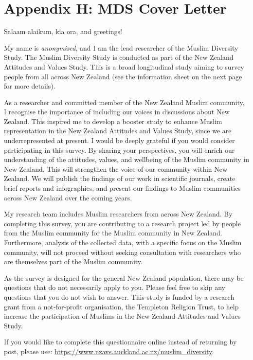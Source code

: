 \documentclass[
]{interact}
\begin{document}
\newpage{}

\section{Appendix H: MDS Cover
Letter}\label{appendix-h-mds-cover-letter}

\noindent Salaam alaikum, kia ora, and greetings!

\noindent My name is \emph{anonymised}, and I am the lead researcher of
the Muslim Diversity Study. The Muslim Diversity Study is conducted as
part of the New Zealand Attitudes and Values Study. This is a broad
longitudinal study aiming to survey people from all across New Zealand
(see the information sheet on the next page for more details).

\noindent As a researcher and committed member of the New Zealand Muslim
community, I recognise the importance of including our voices in
discussions about New Zealand. This inspired me to develop a booster
study to enhance Muslim representation in the New Zealand Attitudes and
Values Study, since we are underrepresented at present. I would be
deeply grateful if you would consider participating in this survey. By
sharing your perspectives, you will enrich our understanding of the
attitudes, values, and wellbeing of the Muslim community in New Zealand.
This will strengthen the voice of our community within New Zealand. We
will publish the findings of our work in scientific journals, create
brief reports and infographics, and present our findings to Muslim
communities across New Zealand over the coming years.

\noindent My research team includes Muslim researchers from across New
Zealand. By completing this survey, you are contributing to a research
project led by people from the Muslim community for the Muslim community
in New Zealand. Furthermore, analysis of the collected data, with a
specific focus on the Muslim community, will not proceed without seeking
consultation with researchers who are themselves part of the Muslim
community.

\noindent As the survey is designed for the general New Zealand
population, there may be questions that do not necessarily apply to you.
Please feel free to skip any questions that you do not wish to answer.
This study is funded by a research grant from a not-for-profit
organisation, the Templeton Religion Trust, to help increase the
participation of Muslims in the New Zealand Attitudes and Values Study.

\begin{tcolorbox}[enhanced jigsaw, colframe=quarto-callout-color-frame, bottomrule=.15mm, breakable, arc=.35mm, left=2mm, rightrule=.15mm, leftrule=.75mm, toprule=.15mm, colback=white, opacityback=0]

If you would like to complete this questionnaire online instead of
returning by post, please use:
\url{https://www.nzavs.auckland.ac.nz/muslim_diversity}.

\end{tcolorbox}
\end{document}
